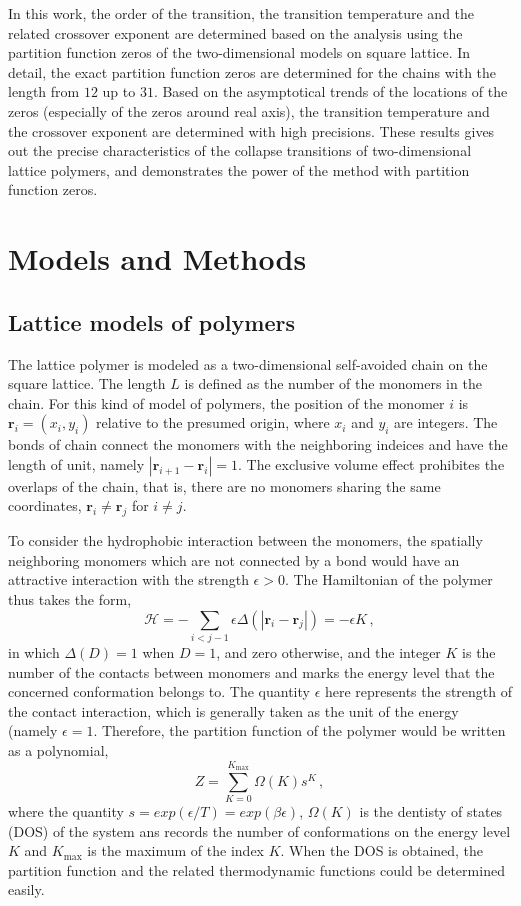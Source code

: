 \documentclass[preprint,preprintnumbers,amsmath,amssymb,showpacs,aps,pre]{revtex4-1}
\begin{document}
In this work, the order of the transition, the transition temperature
and the related crossover exponent are determined based on the analysis
using the partition function zeros of the two-dimensional models
on square lattice. In detail, the exact partition function zeros are
determined for the chains with the length from $12$ up to $31$. Based
on the asymptotical trends of the locations of the zeros (especially
of the zeros around real axis), the transition temperature and the
crossover exponent are determined with high precisions. These results
gives out the precise characteristics of the collapse transitions of
two-dimensional lattice polymers, and demonstrates the power of the
method with partition function zeros.

\section{Models and Methods}

\subsection{Lattice models of polymers}

The lattice polymer is modeled as a two-dimensional self-avoided chain
on the square lattice. The length $L$ is defined as the number of the
monomers in the chain. For this kind of model of polymers, the position
of the monomer $i$ is ${\mathbf r}_i=(x_i,y_i)$ relative to the presumed
origin, where $x_i$ and $y_i$ are integers. The bonds of chain connect
the monomers with the neighboring indeices and have the length of unit,
namely $|{\mathbf r}_{i+1}-{\mathbf r}_i|=1$. The exclusive volume effect
prohibites the overlaps of the chain, that is, there are no monomers sharing
the same coordinates, ${\mathbf r}_i\neq {\mathbf r}_j$ for $i\neq j$. 

To consider the hydrophobic interaction between the monomers, the spatially
neighboring monomers which are not connected by a bond would have an
attractive interaction with the strength $\epsilon>0$. The Hamiltonian of
the polymer thus takes the form,
\begin{equation}
{\mathcal H}=-\sum_{i<j-1}\epsilon \Delta(|{\mathbf r}_i-{\mathbf r}_j|)=
-\epsilon K \, ,
\end{equation}
in which $\Delta(D)=1$ when $D=1$, and zero otherwise, and the integer $K$
is the number of the contacts between monomers and marks the energy level
that the concerned conformation belongs to. The quantity $\epsilon$ here
represents the strength of the contact interaction, which is generally taken
as the unit of the energy (namely $\epsilon=1$. Therefore, the partition
function of the polymer would be written as a polynomial,
\begin{equation}
Z=\sum_{K=0}^{K_{\text{max}}} \Omega(K) s^K \, ,
\end{equation}
where the quantity $s=exp(\epsilon/T)=exp(\beta\epsilon)$, $\Omega(K)$ is
the dentisty of states (DOS) of the system ans records the number 
of conformations on the energy level $K$ and $K_{\text{max}}$ is the
maximum of the index $K$. When the DOS is obtained, the partition function
and the related thermodynamic functions could be determined easily.
\end{document}
